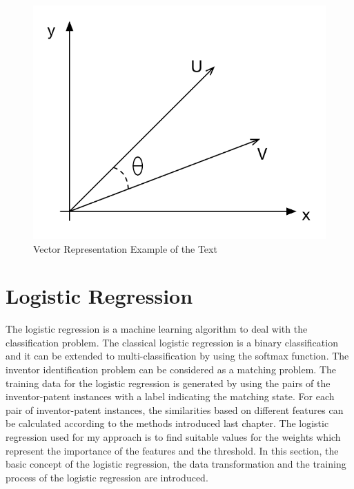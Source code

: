 \begin{figure}
\begin{center}
\includegraphics[scale=0.8]{VectorSpace.pdf}
\caption{Vector Representation Example of the Text}
\end{center}
\end{figure}

\vspace{6pt}

\section{Logistic Regression}
The logistic regression is a machine learning algorithm to deal with the classification problem. The classical logistic regression is a binary classification and it can be extended to multi-classification by using the softmax function. The inventor identification problem can be considered as a matching problem. The training data for the logistic regression is generated by using the pairs of the inventor-patent instances with a label indicating the matching state. For each pair of inventor-patent instances, the similarities based on different features can be calculated according to the methods introduced last chapter. The logistic regression used for my approach is to find suitable values for the weights which represent the importance of the features and the threshold. In this section, the basic concept of the logistic regression, the data transformation and the training process of the logistic regression are introduced.

